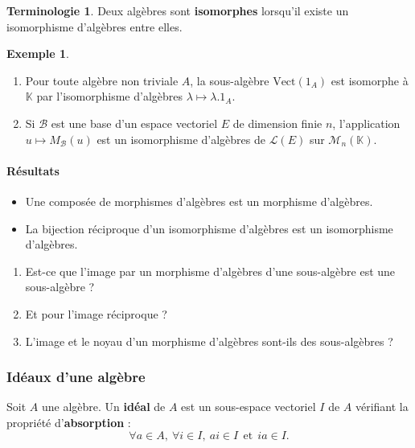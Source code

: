 \documentclass[french]{article}
\newcommand{\K}{\mathbb{K}}
\newcommand{\Vect}{\text{Vect}}
\theoremstyle{plain}
\theoremstyle{definition}
\newtheorem*{ex}{Exemple}
\newtheorem*{terminologie}{Terminologie}
\theoremstyle{remark}
\begin{document}
\begin{terminologie}
	Deux algèbres sont \textbf{isomorphes} lorsqu'il existe un isomorphisme d'algèbres entre elles.
\end{terminologie}

\begin{ex}
	\begin{enumerate}
		\item Pour toute algèbre non triviale $A$, la sous-algèbre $\Vect(1_A)$ est isomorphe à $\K$ par l'isomorphisme d'algèbres $\lambda\mapsto\lambda.1_A$.
		\item Si $\mathcal{B}$ est une base d'un espace vectoriel $E$ de dimension finie $n$, l'application $u\mapsto M_\mathcal{B}(u)$ est un isomorphisme d'algèbres de $\mathcal{L}(E)$ sur $\mathcal{M}_n(\K)$.
	\end{enumerate}
\end{ex}

\paragraph{Résultats}
\begin{itemize}
	\item Une composée de morphismes d'algèbres est un morphisme d'algèbres.
	\item La bijection réciproque d'un isomorphisme d'algèbres est un isomorphisme d'algèbres.
\end{itemize}

\begin{exo}
	\begin{enumerate}
		\item Est-ce que l'image par un morphisme d'algèbres d'une sous-algèbre est une sous-algèbre ?
		\item Et pour l'image réciproque ?
		\item L'image et le noyau d'un morphisme d'algèbres sont-ils des sous-algèbres ?
	\end{enumerate}
\end{exo}

\subsubsection*{Idéaux d'une algèbre}

\begin{dfn}
	Soit $A$ une algèbre. Un \textbf{idéal} de $A$ est un sous-espace vectoriel $I$ de $A$ vérifiant la propriété d'\textbf{absorption} : $$\forall a\in A,\ \forall i\in I,\ ai\in I\ \ \text{et}\ \ ia\in I.$$
\end{dfn}
\end{document}
